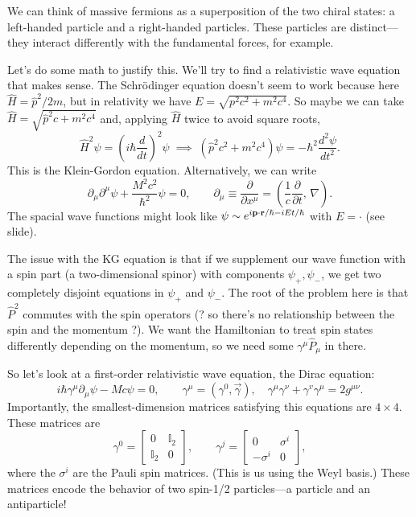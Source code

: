 \documentclass[../p164main.tex]{subfiles}
\begin{document}
We can think of massive fermions as a superposition of the two chiral states: a left-handed particle and a right-handed particles.
These particles are distinct---they interact differently with the fundamental forces, for example.

Let's do some math to justify this.
We'll try to find a relativistic wave equation that makes sense.
The Schrödinger equation doesn't seem to work because here $\hat H = \hat p^2 / 2m$, but in relativity we have $E = \sqrt{p^2 c^2 + m^2 c^{4}}$.
So maybe we can take $\hat H = \sqrt{\hat p^2 c + m^2 c^{4}}$ and, applying $\hat H$ twice to avoid square roots,
\[ \hat H^2 \psi = \left( i\hbar \frac{d}{dt} \right)^2 \psi \;\implies\; (\hat p^2 c^2 + m^2 c^{4}) \psi = -\hbar^2 \frac{d^2 \psi}{dt^2}.  \]
This is the Klein-Gordon equation.
Alternatively, we can write
\[ \partial_\mu \partial^\mu \psi + \frac{M^2 c^2}{\hbar^2} \psi = 0, \qquad \partial_\mu \equiv \frac{\partial}{\partial x^\mu} = \left( \frac{1}{c} \frac{\partial}{\partial t}, \, \nabla \right). \]
The spacial wave functions might look like $\psi \sim e^{i\mathbf{p} \cdot \mathbf{r} / \hbar - iEt / \hbar}$ with $E = \cdot$ (see slide).

The issue with the KG equation is that if we supplement our wave function with a spin part (a two-dimensional spinor) with components $\psi_+, \psi_-$, we get two completely disjoint equations in $\psi_+$ and $\psi_-$.
The root of the problem here is that $\hat P^2$ commutes with the spin operators (? so there's no relationship between the spin and the momentum ?).
We want the Hamiltonian to treat spin states differently depending on the momentum, so we need some $\gamma^\mu \hat P_\mu$ in there.

So let's look at a first-order relativistic wave equation, the Dirac equation:
\[ i \hbar \gamma^\mu \partial_\mu \psi - Mc\psi = 0, \qquad \gamma^\mu = (\gamma^0, \vec{\gamma}), \quad \gamma^\mu \gamma^\nu + \gamma^v \gamma^\mu = 2g^{\mu \nu}. \]
Importantly, the smallest-dimension matrices satisfying this equations are $4 \times 4$.
These matrices are
\[ \gamma^0 = \begin{bmatrix} 0 & \mathbb I_2 \\ \mathbb I_2 & 0 \end{bmatrix}, \qquad \gamma^j = \begin{bmatrix} 0 & \sigma^i \\ -\sigma^i & 0 \end{bmatrix}, \]
where the $\sigma^i$ are the Pauli spin matrices.
(This is us using the Weyl basis.)
These matrices encode the behavior of two spin-1/2 particles---a particle and an antiparticle!
\end{document}
